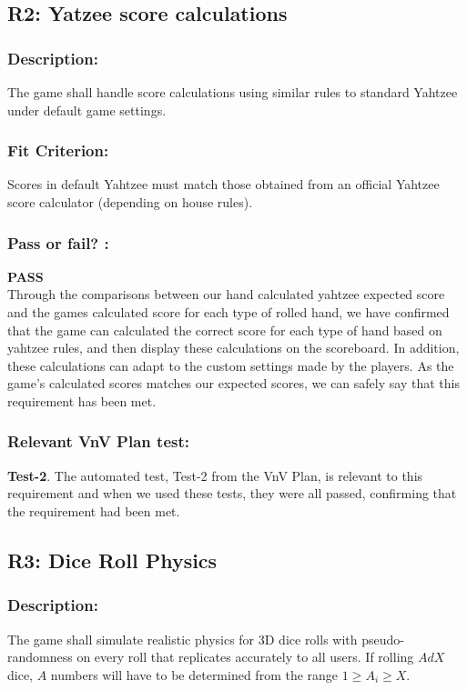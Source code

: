 \documentclass[12pt, titlepage]{article}
\begin{document}
\subsection{R2: Yatzee score calculations}
\label{R2} 
  
   \subsubsection*{Description:}  The game shall handle score calculations using similar rules to standard Yahtzee under default game settings.

 \subsubsection*{Fit Criterion:}  Scores in default Yahtzee must match those obtained from an official Yahtzee score calculator (depending on house rules).
 
 \subsubsection*{Pass or fail? :}
 
 \noindent \textbf{PASS}\\
 
 Through the comparisons between our hand calculated yahtzee  expected score and the games calculated score for each type of rolled hand, we have confirmed that the game can calculated the correct score for each type of hand based on yahtzee rules, and then display these calculations on the scoreboard. In addition, these calculations can adapt to the custom settings made by the players. As the game's calculated scores matches our expected scores, we can safely say that this requirement has been met. 
 
 \subsubsection*{Relevant VnV Plan test: }  \textbf{ Test-2}. The automated test, Test-2 from the VnV Plan, is relevant to this requirement and when we used these tests, they were all passed, confirming that the requirement had been met.


\subsection{R3: Dice Roll Physics} 
\label{R3}  
  
\subsubsection*{Description:}The game shall simulate realistic physics for 3D dice rolls with pseudo-randomness on every roll that replicates accurately to all users. If rolling $AdX$ dice, $A$ numbers will have to be determined from the range $1 \geq A_{i} \geq X$.
\end{document}
